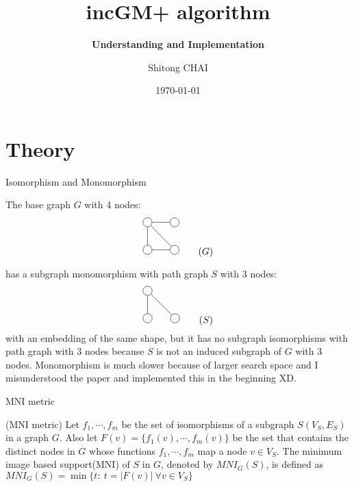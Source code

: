 \documentclass[10pt,aspectratio=43,mathserif]{beamer}
\title{incGM+ algorithm}
\subtitle{\fontsize{9pt}{14pt}\textbf{Understanding and Implementation}}
\author{Shitong CHAI}
\institute{ISIMA}
\date{\today}
\begin{document}
\frame{\titlepage}

\section{Theory}
\begin{frame}{Isomorphism and Monomorphism}

    The base graph $G$ with 4 nodes:
    \begin{equation}
    \begin{tikzpicture}
        \node[shape=circle,draw=black] (A) at (0,0) {};
        \node[shape=circle,draw=black] (B) at (0,1) {};
        \node[shape=circle,draw=black] (C) at (1,0) {};
        \node[shape=circle,draw=black] (D) at (1,1) {};
        \path [-] (A) edge node {} (B);
        \path [-] (B) edge node {} (C);
        \path [-] (A) edge node {} (C);
        \path [-] (B) edge node {} (D); 
    \end{tikzpicture}
\tag{$G$}
    \end{equation}

    has a subgraph monomorphism with path graph $S$ with 3 nodes:
    \begin{equation}
    \begin{tikzpicture}
        \node[shape=circle,draw=black] (A) at (0,0) {};
        \node[shape=circle,draw=black] (B) at (0,1) {};
        \node[shape=circle,draw=black] (C) at (1,0) {};
        \path [-] (A) edge node {} (B);
        \path [-] (B) edge node {} (C); 
    \end{tikzpicture}
\tag{$S$}
    \end{equation}
    with an embedding of the same shape, but it has no subgraph isomorphisms with path graph with 3 nodes because $S$ is not an induced subgraph of $G$ with 3 nodes. Monomorphism is much slower because of larger search space and I misunderstood the paper and implemented this in the beginning XD.

\end{frame}

\begin{frame}{MNI metric}

\begin{definition}
    (MNI metric\cite{grami}) Let $f_1,\cdots,f_m$ be the set of isomorphisms of a subgraph $S(V_S,E_S)$ in a graph $G$. Also let $F(v)=\{f_1(v),\cdots,f_m(v)\}$ be the set that contains the distinct nodes in $G$ whose functions $f_1,\cdots,f_m$ map a node $v\in V_S$. The minimum image based support(MNI) of $S$ in $G$, denoted by $MNI_G(S)$, is defined as $MNI_G(S)=\min\{t:\ t=|F(v)|\ \forall v\in V_S\}$
\end{definition}

\end{frame}
\end{document}
